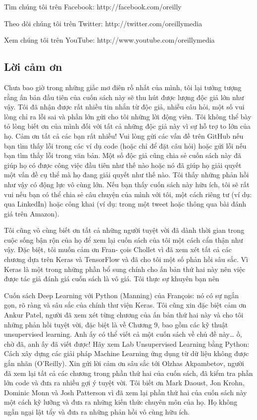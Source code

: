 Tìm chúng tôi trên Facebook: http://facebook.com/oreilly

Theo dõi chúng tôi trên Twitter: http://twitter.com/oreillymedia

Xem chúng tôi trên YouTube: http://www.youtube.com/oreillymedia

\subsection{Lời cảm ơn}

Chưa bao giờ trong những giấc mơ điên rồ nhất của mình, tôi lại tưởng tượng rằng ấn bản đầu tiên của cuốn sách này sẽ thu hút được lượng độc giả lớn như vậy. Tôi đã nhận được rất nhiều tin nhắn từ độc giả, nhiều câu hỏi, một số vui lòng chỉ ra lỗi sai và phần lớn gửi cho tôi những lời động viên. Tôi không thể bày tỏ lòng biết ơn của mình đối với tất cả những độc giả này vì sự hỗ trợ to lớn của họ. Cảm ơn tất cả các bạn rất nhiều! Vui lòng gửi các vấn đề trên GitHub nếu bạn tìm thấy lỗi trong các ví dụ code (hoặc chỉ để đặt câu hỏi) hoặc gửi lỗi nếu bạn tìm thấy lỗi trong văn bản. Một số độc giả cũng chia sẻ cuốn sách này đã giúp họ có được công việc đầu tiên như thế nào hoặc nó đã giúp họ giải quyết một vấn đề cụ thể mà họ đang giải quyết như thế nào. Tôi thấy những phản hồi như vậy có động lực vô cùng lớn. Nếu bạn thấy cuốn sách này hữu ích, tôi sẽ rất vui nếu bạn có thể chia sẻ câu chuyện của mình với tôi, một cách riêng tư (ví dụ: qua LinkedIn) hoặc công khai (ví dụ: trong một tweet hoặc thông qua bài đánh giá trên Amazon).

Tôi cũng vô cùng biết ơn tất cả những người tuyệt vời đã dành thời gian trong cuộc sống bận rộn của họ để xem lại cuốn sách của tôi một cách cẩn thận như vậy. Đặc biệt, tôi muốn cảm ơn Fran‐ çois Chollet vì đã xem xét tất cả các chương dựa trên Keras và TensorFlow và đã cho tôi một số phản hồi sâu sắc. Vì Keras là một trong những phần bổ sung chính cho ấn bản thứ hai này nên việc được tác giả đánh giá cuốn sách là vô giá. Tôi thực sự khuyên bạn nên

Cuốn sách Deep Learning với Python (Manning) của François: nó có sự ngắn gọn, rõ ràng và sâu sắc của chính thư viện Keras. Tôi cũng xin đặc biệt cảm ơn Ankur Patel, người đã xem xét từng chương của ấn bản thứ hai này và cho tôi những phản hồi tuyệt vời, đặc biệt là về Chương 9, bao gồm các kỹ thuật unsupervised learning. Anh ấy có thể viết cả một cuốn sách về chủ đề này… ồ, chờ đã, anh ấy đã viết được! Hãy xem Lab Unsupervised Learning bằng Python: Cách xây dựng các giải pháp Machine Learning ứng dụng từ dữ liệu không được gắn nhãn (O'Reilly). Xin gửi lời cảm ơn sâu sắc tới Olzhas Akpambetov, người đã xem lại tất cả các chương trong phần thứ hai của cuốn sách, đã kiểm tra phần lớn code và đưa ra nhiều gợi ý tuyệt vời. Tôi biết ơn Mark Daoust, Jon Krohn, Dominic Monn và Josh Patterson vì đã xem lại phần thứ hai của cuốn sách này một cách kỹ lưỡng và đưa ra những kiến ​​thức chuyên môn của họ. Họ không ngần ngại lật tẩy và đưa ra những phản hồi vô cùng hữu ích.

